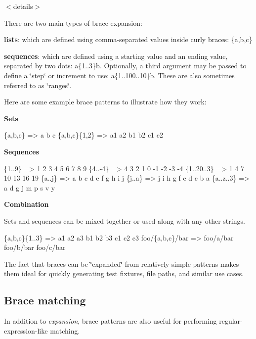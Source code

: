 $<$details$>$

There are two main types of brace expansion\+:


\begin{DoxyEnumerate}
\item {\bfseries lists}\+: which are defined using comma-\/separated values inside curly braces\+: {\ttfamily \{a,b,c\}}
\item {\bfseries sequences}\+: which are defined using a starting value and an ending value, separated by two dots\+: {\ttfamily a\{1..3\}b}. Optionally, a third argument may be passed to define a \char`\"{}step\char`\"{} or increment to use\+: {\ttfamily a\{1..100..10\}b}. These are also sometimes referred to as \char`\"{}ranges\char`\"{}.
\end{DoxyEnumerate}

Here are some example brace patterns to illustrate how they work\+:

{\bfseries Sets}


\begin{DoxyCode}
\{a,b,c\}       => a b c
\{a,b,c\}\{1,2\}  => a1 a2 b1 b2 c1 c2
\end{DoxyCode}


{\bfseries Sequences}


\begin{DoxyCode}
\{1..9\}        => 1 2 3 4 5 6 7 8 9
\{4..-4\}       => 4 3 2 1 0 -1 -2 -3 -4
\{1..20..3\}    => 1 4 7 10 13 16 19
\{a..j\}        => a b c d e f g h i j
\{j..a\}        => j i h g f e d c b a
\{a..z..3\}     => a d g j m p s v y
\end{DoxyCode}


{\bfseries Combination}

Sets and sequences can be mixed together or used along with any other strings.


\begin{DoxyCode}
\{a,b,c\}\{1..3\}   => a1 a2 a3 b1 b2 b3 c1 c2 c3
foo/\{a,b,c\}/bar => foo/a/bar foo/b/bar foo/c/bar
\end{DoxyCode}


The fact that braces can be \char`\"{}expanded\char`\"{} from relatively simple patterns makes them ideal for quickly generating test fixtures, file paths, and similar use cases.

\subsection*{Brace matching}

In addition to {\itshape expansion}, brace patterns are also useful for performing regular-\/expression-\/like matching.

